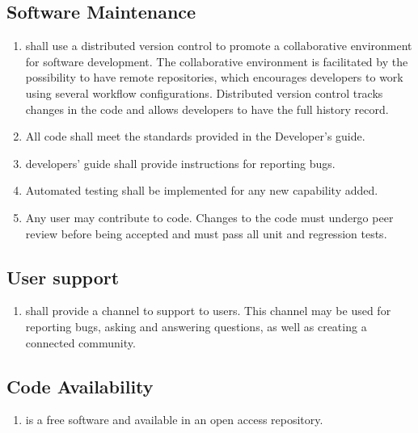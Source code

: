 \subsection{Software Maintenance}
\begin{enumerate}[resume]
	\item \pft shall use a distributed version control to promote a collaborative environment for software development. The collaborative environment is facilitated by the possibility to have remote repositories, which encourages developers to work using several workflow configurations. Distributed version control tracks changes in the code and allows developers to have the full history record.\label{versionControl}
	\item All code shall meet the standards provided in the Developer’s guide. \label{codeStandard}
	\item \pft developers’ guide shall provide instructions for reporting bugs.\label{reportBugs}
	\item Automated testing shall be implemented for any new capability added.\label{autTesting}
	\item Any user may contribute to \pft code. Changes to the code must undergo peer review before being accepted and must pass all unit and regression tests.\label{contribution}
\end{enumerate}

\subsection{User support}
\begin{enumerate}[resume]
	\item \pft shall provide a channel to support to users. This channel may be used for reporting bugs, asking and answering questions, as well as creating a connected community.\label{userSupport}
\end{enumerate}

\subsection{Code Availability}
\begin{enumerate}[resume]
	\item \pft is a free software and available in an open access repository.\label{codeAvail}
\end{enumerate}




















